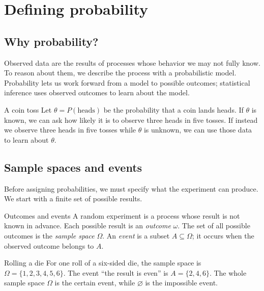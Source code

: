\documentclass[a4paper,12pt,oneside]{report}
\begin{document}
\makenotestitle
\notescontents

\chapter{Defining probability}

\section{Why probability?}

Observed data are the results of processes whose behavior we may not fully
know. To reason about them, we describe the process with a probabilistic
model. Probability lets us work forward from a model to possible outcomes;
statistical inference uses observed outcomes to learn about the model.

\begin{framedexample}{A coin toss}
Let $\theta=P(\text{heads})$ be the probability that a coin lands heads.
If $\theta$ is known, we can ask how likely it is to observe three heads
in five tosses. If instead we observe three heads in five tosses while
$\theta$ is unknown, we can use those data to learn about $\theta$.
\end{framedexample}

\section{Sample spaces and events}

Before assigning probabilities, we must specify what the experiment can
produce. We start with a finite set of possible results.

\begin{frameddefn}{Outcomes and events}\label{def:outcomes-events}
A random experiment is a process whose result is not known in advance.
Each possible result is an \emph{outcome} $\omega$. The set of all possible
outcomes is the \emph{sample space} $\Omega$. An \emph{event} is a subset
$A\subseteq\Omega$; it occurs when the observed outcome belongs to $A$.
\end{frameddefn}

\begin{framedexample}{Rolling a die}\label{ex:die-events}
For one roll of a six-sided die, the sample space is
$\Omega=\{1,2,3,4,5,6\}$. The event ``the result is even'' is
$A=\{2,4,6\}$. The whole sample space $\Omega$ is the certain event,
while $\varnothing$ is the impossible event.
\end{framedexample}
\end{document}
